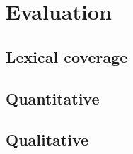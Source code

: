 \section{Evaluation}

\subsection{Lexical coverage}

\subsection{Quantitative}

\subsection{Qualitative}
